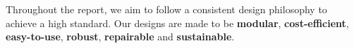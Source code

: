 Throughout the report, we aim to follow a consistent design philosophy to achieve a high standard. Our designs are made to be \textbf{modular}, \textbf{cost-efficient}, \textbf{easy-to-use}, \textbf{robust}, \textbf{repairable} and \textbf{sustainable}.


